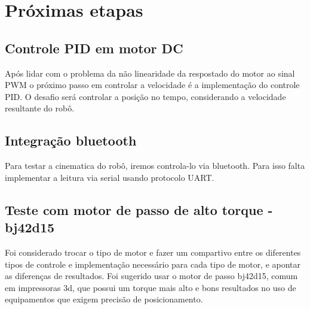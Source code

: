 

\chapter{Próximas etapas}

\section{Controle PID em motor DC}
Após lidar com o problema da não linearidade da respostado do motor ao sinal PWM
o próximo passo em controlar a velocidade é a implementação do controle PID.
O desafio será controlar a posição no tempo, considerando a velocidade resultante do robô.

\section{Integração bluetooth}
Para testar a cinematica do robô, iremos controla-lo via bluetooth. Para isso falta implementar a leitura via serial usando protocolo UART.

\section{Teste com motor de passo de alto torque - bj42d15}
Foi considerado trocar o tipo de motor e fazer um compartivo entre os diferentes tipos de controle e implementação necessário para cada tipo de motor,
e apontar as diferenças de resultados.
Foi sugerido usar o motor de passo bj42d15, comum em impressoras 3d, que possui um torque mais alto e bons resultados no uso de equipamentos que exigem precisão de posicionamento.